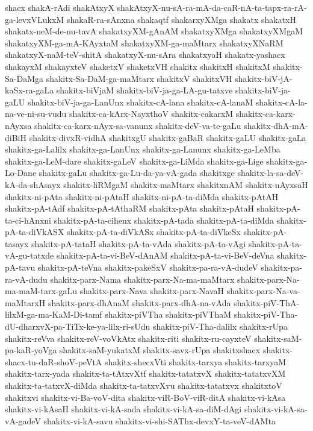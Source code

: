 {shacx
shakA-rAdi
shakAtxyX
shakAtxyX-nu-sA-ra-mA-da-caR-nA-ta-tapx-ra-rA-ga-levxVLukxM
shakaR-ra-sAnxna
shakaqtf
shakarxyXMga
shakatx
shakatxH
shakatx-neM-de-nu-tavA
shakatxyXM-gAnAM
shakatxyXMga
shakatxyXMgaM
shakatxyXM-ga-mA-KAyxtaM
shakatxyXM-ga-maMtarx
shakatxyXNaRM
shakatxyX-naM-teV-shitA
shakatxyX-nu-sAra
shakatxyaH
shakatx-yashacx
shakayxM
shakayxteV
shaketxV
shaketxVH
shakitx
shakitxH
shakitxM
shakitx-Sa-DaMga
shakitx-Sa-DaM-ga-maMtarx
shakitxV
shakitxVH
shakitx-biV-jA-kaSx-ra-gaLa
shakitx-biVjaM
shakitx-biV-ja-ga-LA-gu-tatxve
shakitx-biV-ja-gaLU
shakitx-biV-ja-ga-LanUnx
shakitx-cA-lana
shakitx-cA-lanaM
shakitx-cA-la-na-ve-ni-su-vudu
shakitx-ca-kArx-NayxthoV
shakitx-cakarxM
shakitx-ca-karx-nAyxsa
shakitx-ca-karx-nAyx-sa-vanunx
shakitx-deV-va-te-gaLu
shakitx-dhA-mA-diBiH
shakitx-divxR-vidhA
shakitxgU
shakitx-gaBaR
shakitx-gaLU
shakitx-gaLa
shakitx-ga-Lalilx
shakitx-ga-LanUnx
shakitx-ga-Lanunx
shakitx-ga-LeMba
shakitx-ga-LeM-dare
shakitx-gaLeV
shakitx-ga-LiMda
shakitx-ga-Lige
shakitx-ga-Lo-Dane
shakitx-gaLu
shakitx-ga-Lu-da-ya-vA-gada
shakitxge
shakitx-la-sa-deV-kA-da-shAsayx
shakitx-liRMgaM
shakitx-maMtarx
shakitxnAM
shakitx-nAyxsaH
shakitx-ni-pAta
shakitx-ni-pAtaH
shakitx-ni-pA-ta-diMda
shakitx-pAtAH
shakitx-pA-tAdf
shakitx-pA-tAthaRM
shakitx-pAta
shakitx-pAtaH
shakitx-pA-ta-ci-hAnxni
shakitx-pA-ta-cihenx
shakitx-pA-tada
shakitx-pA-ta-diMda
shakitx-pA-ta-diVkASX
shakitx-pA-ta-diVkASx
shakitx-pA-ta-diVkeSx
shakitx-pA-tasayx
shakitx-pA-tataH
shakitx-pA-ta-vAda
shakitx-pA-ta-vAgi
shakitx-pA-ta-vA-gu-tatxde
shakitx-pA-ta-vi-BeV-dAnAM
shakitx-pA-ta-vi-BeV-deVna
shakitx-pA-tavu
shakitx-pA-teVna
shakitx-pakeSxV
shakitx-pa-ra-vA-dudeV
shakitx-pa-ra-vA-dudu
shakitx-parx-Nama
shakitx-parx-Na-ma-maMtarx
shakitx-parx-Na-ma-maM-tarx-gaLu
shakitx-parx-Nava
shakitx-parx-NavaH
shakitx-parx-Na-va-maMtarxH
shakitx-parx-dhAnaM
shakitx-parx-dhA-na-vAda
shakitx-piV-ThA-lilxM-ga-ma-KaM-Di-tamf
shakitx-piVTha
shakitx-piVThaM
shakitx-piV-Tha-dU-dharxvX-pa-TiTx-ke-ya-lilx-ri-sUdu
shakitx-piV-Tha-dalilx
shakitx-rUpa
shakitx-reVva
shakitx-reV-voVkAtx
shakitx-riti
shakitx-ru-cayxteV
shakitx-saM-pa-kaR-yoVga
shakitx-saM-yukatxM
shakitx-savx-rUpa
shakitxshacx
shakitx-shacx-tu-daR-shoV-peVtA
shakitx-shecxVti
shakitx-tarxya
shakitx-tarxyaM
shakitx-tarx-yada
shakitx-ta-tAtxvXtf
shakitx-tatatxvX
shakitx-tatatxvXM
shakitx-ta-tatxvX-diMda
shakitx-ta-tatxvXvu
shakitx-tatatxvx
shakitxtoV
shakitxvi
shakitx-vi-Ba-voV-dita
shakitx-viR-BoV-viR-ditA
shakitx-vi-kAsa
shakitx-vi-kAsaH
shakitx-vi-kA-sada
shakitx-vi-kA-sa-diM-dAgi
shakitx-vi-kA-sa-vA-gadeV
shakitx-vi-kA-savu
shakitx-vi-shi-SAThx-devxY-ta-veV-dAMta
}
